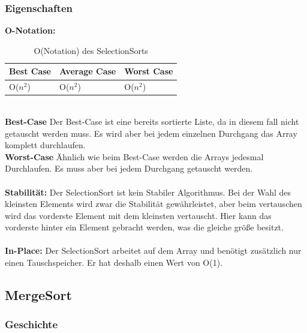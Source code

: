 \documentclass{article}
\begin{document}
\subsubsection{Eigenschaften}
\textbf{O-Notation:}
\begin{table}[h]
\centering
\begin{tabular}{lll}
	\hline
	\textbf{Best Case} & \textbf{Average Case} & \textbf{Worst Case} \\
	\hline
	O($n^{2}$) & O($n^{2}$) & O($n^{2}$) \\
	\hline
\end{tabular}
\caption{O(Notation) des SelectionSorts \cite{India2015Dataset}}
\label{tab:SelectionSort}
\end{table}
\\
\textbf{Best-Case} Der Best-Case ist eine bereits sortierte Liste, da in diesem fall nicht getauscht werden muss. Es wird aber bei jedem einzelnen Durchgang das Array komplett durchlaufen. \\
\textbf{Worst-Case} Ähnlich wie beim Best-Case werden die Arrays jedesmal Durchlaufen. Es muss aber bei jedem Durchgang getauscht werden.\\ \\
\textbf{Stabilität:} Der SelectionSort ist kein Stabiler Algorithmus. Bei der Wahl des kleinsten Elements wird zwar die Stabilität gewährleistet, aber beim vertauschen wird das vorderste Element mit dem kleinsten vertauscht. Hier kann das vorderste hinter ein Element gebracht werden, was die gleiche größe besitzt.   \\
\\
\textbf{In-Place:}  Der SelectionSort arbeitet auf dem Array und benötigt zusätzlich nur einen Tauschspeicher. Er hat deshalb einen Wert von O(1). \\

\subsection{MergeSort}
\subsubsection{Geschichte}
\end{document}
